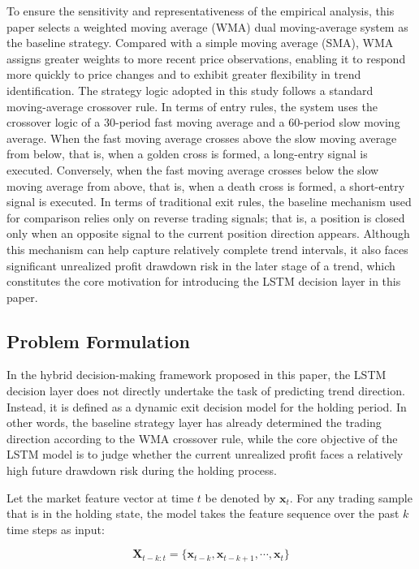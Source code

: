 \documentclass[12pt]{article}
\begin{document}
To ensure the sensitivity and representativeness of the empirical analysis, this paper selects 
a weighted moving average (WMA) dual moving-average system as the baseline strategy. Compared 
with a simple moving average (SMA), WMA assigns greater weights to more recent price 
observations, enabling it to respond more quickly to price changes and to exhibit greater 
flexibility in trend identification. The strategy logic adopted in this study follows a 
standard moving-average crossover rule. In terms of entry rules, the system uses the crossover 
logic of a 30-period fast moving average and a 60-period slow moving average. When the fast 
moving average crosses above the slow moving average from below, that is, when a golden cross 
is formed, a long-entry signal is executed. Conversely, when the fast moving average crosses 
below the slow moving average from above, that is, when a death cross is formed, a short-entry 
signal is executed. In terms of traditional exit rules, the baseline mechanism used for 
comparison relies only on reverse trading signals; that is, a position is closed only when an 
opposite signal to the current position direction appears. Although this mechanism can help 
capture relatively complete trend intervals, it also faces significant unrealized profit 
drawdown risk in the later stage of a trend, which constitutes the core motivation for 
introducing the LSTM decision layer in this paper.

\subsection{Problem Formulation}

In the hybrid decision-making framework proposed in this paper, the LSTM decision layer does 
not directly undertake the task of predicting trend direction. Instead, it is defined as a 
dynamic exit decision model for the holding period. In other words, the baseline strategy layer 
has already determined the trading direction according to the WMA crossover rule, while the 
core objective of the LSTM model is to judge whether the current unrealized profit faces a 
relatively high future drawdown risk during the holding process.

Let the market feature vector at time $t$ be denoted by $\mathbf{x}_t$. For any trading sample 
that is in the holding state, the model takes the feature sequence over the past $k$ time steps 
as input:

\begin{equation}
    \mathbf{X}_{t-k:t} = \{\mathbf{x}_{t-k}, \mathbf{x}_{t-k+1}, \cdots, \mathbf{x}_{t}\}
\end{equation}
\end{document}
